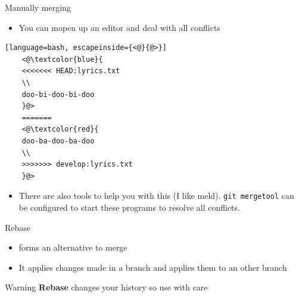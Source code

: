 \documentclass[12pt]{beamer}
\begin{document}
\begin{frame}
\end{frame}

\begin{frame}[fragile]{Manually merging}
		\begin{itemize}
			\item You can mopen up an editor and deal with all conflicts
		\end{itemize}
	\begin{lstlisting}[language=bash, escapeinside={<@}{@>}]
	<@\textcolor{blue}{ 
	<<<<<<< HEAD:lyrics.txt
	\\
	doo-bi-doo-bi-doo
	}@> 
	=======
	<@\textcolor{red}{ 
	doo-ba-doo-ba-doo 
	\\
	>>>>>>> develop:lyrics.txt 
	}@>
	\end{lstlisting}
		\begin{itemize}
		\item There are also tools to help you with this (I like meld). \texttt{git mergetool} can be configured to start these programs to resolve all conflicts.
		\end{itemize}
\end{frame}

\begin{frame}[fragile]{Rebase}
	\begin{itemize}
		\item \texttt{} forms an alternative to merge
		\item It applies changes made in a branch and applies them to an other branch
	\end{itemize}
 \begin{alertblock}{Warning}
	\textbf{Rebase} changes your history so use with care
\end{alertblock}

\end{frame}
\end{document}
